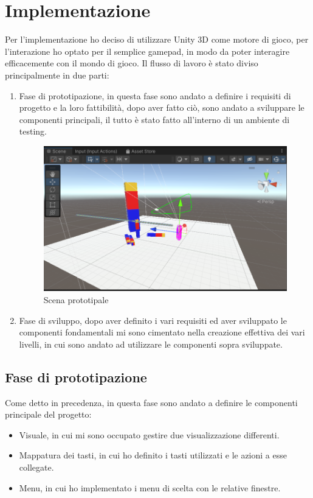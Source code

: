 \documentclass[
a4paper,
cleardoublepage=empty,
headings=twolinechapter,
numbers=autoenddot,
]{scrbook}
\begin{document}
    \section{Implementazione}
    Per l'implementazione ho deciso di utilizzare Unity 3D come motore di gioco, per l'interazione ho optato per il semplice gamepad, in modo da poter interagire efficacemente con il mondo di gioco.
    Il flusso di lavoro è stato diviso principalmente in due parti:
    \begin{enumerate}
        \item Fase di prototipazione, in questa fase sono andato a definire i requisiti di progetto e la loro fattibilità, dopo aver fatto ciò, sono andato a sviluppare le componenti principali, il tutto è stato fatto all'interno di un ambiente di testing.
        \begin{figure}[H]
        	\centering
        	\includegraphics[width=0.8\linewidth]{image/protot}
        	\caption{Scena prototipale}
        	\label{fig:protot}
        \end{figure}
        \item Fase di sviluppo, dopo aver definito i vari requisiti ed aver sviluppato le componenti fondamentali mi sono cimentato nella creazione effettiva dei vari livelli, in cui sono andato ad utilizzare le componenti sopra sviluppate.
    \end{enumerate}
    \subsection{Fase di prototipazione}
     Come detto in precedenza, in questa fase sono andato a definire le componenti principale del progetto:
     \begin{itemize}
     	\item Visuale, in cui mi sono occupato gestire due visualizzazione differenti.
     	\item Mappatura dei tasti, in cui ho definito i tasti utilizzati e le azioni a esse collegate.
     	\item Menu, in cui ho implementato i menu di scelta con le relative finestre.
     \end{itemize}
\end{document}

